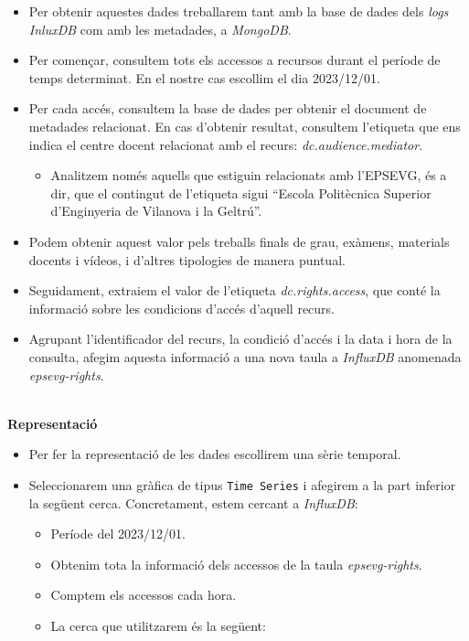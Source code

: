 \begin{itemize}
    \item Per obtenir aquestes dades treballarem tant amb la base de dades dels \textit{\gls{log}s} \textit{InluxDB} com amb les metadades, a \textit{MongoDB}.
    \item Per començar, consultem tots els accessos a recursos durant el període de temps determinat.
    En el nostre cas escollim el dia 2023/12/01.
    \item Per cada accés, consultem la base de dades per obtenir el document de metadades relacionat.
    En cas d'obtenir resultat, consultem l'etiqueta que ens indica el centre docent relacionat amb el recurs: \textit{dc.audience.mediator}.
    \begin{itemize}
        \item Analitzem només aquells que estiguin relacionats amb l'EPSEVG, és a dir, que el contingut de l'etiqueta sigui ``Escola Politècnica Superior d'Enginyeria de Vilanova i la Geltrú''.
    \end{itemize}
    \item Podem obtenir aquest valor pels treballs finals de grau, exàmens, materials docents i vídeos, i d'altres tipologies de manera puntual.
    \item Seguidament, extraiem el valor de l'etiqueta \textit{dc.rights.access}, que conté la informació sobre les condicions d'accés d'aquell recurs.
    \item Agrupant l'identificador del recurs, la condició d'accés i la data i hora de la consulta, afegim aquesta informació a una nova taula a \textit{InfluxDB} anomenada \textit{epsevg-rights}.

\end{itemize}

\clearpage

\noindent \\
\textbf{Representació}

\begin{itemize}
    \item Per fer la representació de les dades escollirem una sèrie temporal.
    \item Seleccionarem una gràfica de tipus \texttt{Time Series} i afegirem a la part inferior la següent cerca.
    Concretament, estem cercant a \textit{InfluxDB}:
    \begin{itemize}
        \item Període del 2023/12/01.
        \item Obtenim tota la informació dels accessos de la taula \textit{epsevg-rights}.
        \item Comptem els accessos cada hora.
        \item La cerca que utilitzarem és la següent:
    \end{itemize}
\end{itemize}

